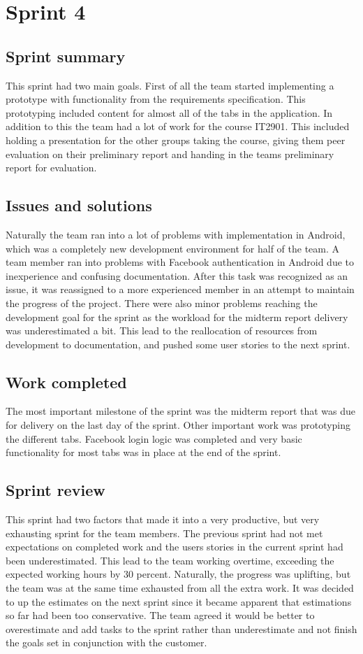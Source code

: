 \section{Sprint 4}
\subsection{Sprint summary}
This sprint had two main goals. First of all the team started implementing a prototype with functionality from the requirements specification. This prototyping included content for almost all of the tabs in the application. In addition to this the team had a lot of work for the course IT2901. This included holding a presentation for the other groups taking the course, giving them peer evaluation on their preliminary report and handing in the teams preliminary report for evaluation.



\subsection{Issues and solutions}
Naturally the team ran into a lot of problems with implementation in Android, which was a completely new development environment for half of the team. A team member ran into problems with Facebook authentication in Android due to inexperience and confusing documentation. After this task was recognized as an issue, it was reassigned to a more experienced member in an attempt to maintain the progress of the project. There were also minor problems reaching the development goal for the sprint as the workload for the midterm report delivery was underestimated a bit. This lead to the reallocation of resources from development to documentation, and pushed some user stories to the next sprint.

\subsection{Work completed}
The most important milestone of the sprint was the midterm report that was due for delivery on the last day of the sprint. Other important work was prototyping the different tabs. Facebook login logic was completed and very basic functionality for most tabs was in place at the end of the sprint.

\subsection{Sprint review}
This sprint had two factors that made it into a very productive, but very exhausting sprint for the team members. The previous sprint had not met expectations on completed work and the users stories in the current sprint had been underestimated. This lead to the team working overtime, exceeding the expected working hours by 30 percent. Naturally, the progress was uplifting, but the team was at the same time exhausted from all the extra work. It was decided to up the estimates on the next sprint since it became apparent that estimations so far had been too conservative. The team agreed it would be better to overestimate and add tasks to the sprint rather than underestimate and not finish the goals set in conjunction with the customer.